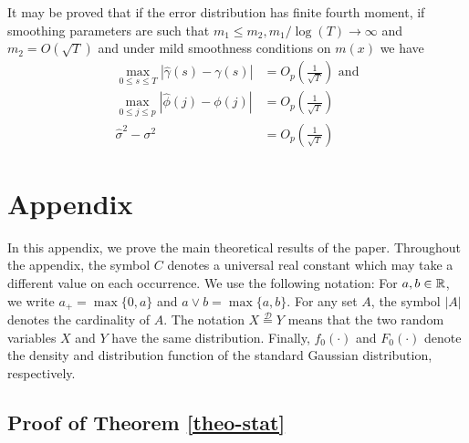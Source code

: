 \documentclass[a4paper,12pt]{article}
\numberwithin{equation}{section}
\begin{document}
It may be proved that if the error distribution has finite fourth moment, if smoothing parameters are such that $m_1 \le m_2, m_1/\log(T) \rightarrow \infty$ and $m_2 = O(\sqrt{T})$ and under mild smoothness conditions on $m(x)$ we have 
\begin{align*}
\max_{0\le s \le T} |\hat{\gamma}(s) - \gamma(s)| &= O_p(\frac{1}{\sqrt{T}}) \text{ and} \\
\max_{0\le j \le p} |\hat{\phi}(j) - \phi(j)| &= O_p(\frac{1}{\sqrt{T}}) \\
\hat{\sigma}^2 - \sigma^2 &= O_p (\frac{1}{\sqrt{T}})
\end{align*}
\vspace{1pt}

\newpage
\section*{Appendix}

\def\theequation{A.\arabic{equation}}
\setcounter{equation}{0}
\allowdisplaybreaks[3]


In this appendix, we prove the main theoretical results of the paper. Throughout the appendix, the symbol $C$ denotes a universal real constant which may take a different value on each occurrence. We use the following notation: For $a,b \in \mathbb{R}$, we write $a_+ = \max \{0,a\}$ and $a \vee b = \max\{a,b\}$. For any set $A$, the symbol $|A|$ denotes the cardinality of $A$. The notation $X \stackrel{\mathcal{D}}{=} Y$ means that the two random variables $X$ and $Y$ have the same distribution. Finally, $f_0(\cdot)$ and $F_0(\cdot)$ denote the density and distribution function of the standard Gaussian distribution, respectively.



\subsection*{Proof of Theorem \ref{theo-stat}}
\end{document}
